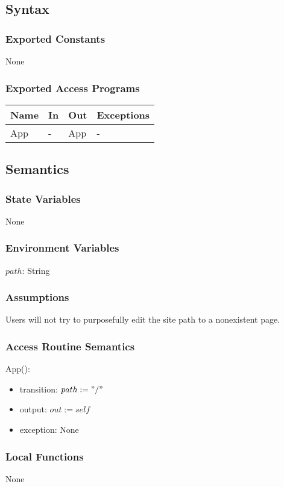 \documentclass[12pt, titlepage]{article}
\begin{document}
\subsection{Syntax}
\subsubsection{Exported Constants}
None
\subsubsection{Exported Access Programs}
\begin{center}
	\begin{tabular}{p{3cm} p{4cm} p{4cm} p{3cm}}
		
		\hline
		\textbf{Name} & \textbf{In} & \textbf{Out} & \textbf{Exceptions} \\
		\hline
		App & - & App & - \\
		\hline
	\end{tabular}
\end{center}
\subsection{Semantics}
\subsubsection{State Variables}
None
\subsubsection{Environment Variables}
$path$: String
\subsubsection{Assumptions}
Users will not try to purposefully edit the site path to a nonexistent page.
\subsubsection{Access Routine Semantics}
App():
\begin{itemize}
	\item transition: $path := "/"$
	\item output: $out := self$
	\item exception: None
\end{itemize}
\subsubsection{Local Functions}
None
\end{document}
